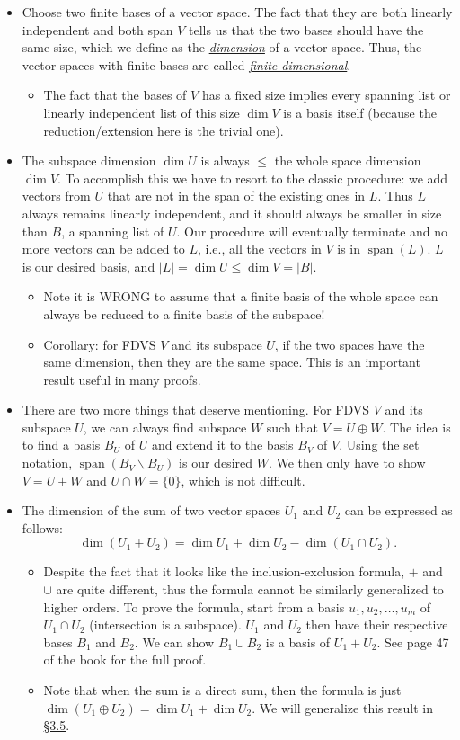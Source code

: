 \documentclass[11pt]{article}
\newcommand{\lk}[2]{\hyperlink{subsection.#1.#2}{\S#1.#2}}
\newcommand{\df}[1]{\ul{\textit{\textsf{#1}}}}
\newcommand{\s}{\operatorname{span}}
\renewcommand{\d}{\dim}
\newcommand{\abs}[1]{\lvert #1 \rvert}
\begin{document}
\begin{itemize}
    \item Choose two finite bases of a vector space. The fact that they are both linearly independent and both span $V$ tells us that the two bases should have the same size, which we define as the \df{dimension} of a vector space. Thus, the vector spaces with finite bases are called \df{finite-dimensional}.
    \begin{itemize}
        \item The fact that the bases of $V$ has a fixed size implies every spanning list or linearly independent list of this size $\d V$ is a basis itself (because the reduction/extension here is the trivial one).
    \end{itemize}
    \item The subspace dimension $\d U$ is always $\leq$ the whole space dimension $\d V$. To accomplish this we have to resort to the classic procedure: we add vectors from $U$ that are not in the span of the existing ones in $L$. Thus $L$ always remains linearly independent, and it should always be smaller in size than $B$, a spanning list of $U$. Our procedure will eventually terminate and no more vectors can be added to $L$, i.e., all the vectors in $V$ is in $\s(L)$. $L$ is our desired basis, and $\abs{L} = \d U \leq \d V = \abs{B}$.
    \begin{itemize}
        \item Note it is WRONG to assume that a finite basis of the whole space can always be reduced to a finite basis of the subspace!
        \item Corollary: for FDVS $V$ and its subspace $U$, if the two spaces have the same dimension, then they are the same space. This is an important result useful in many proofs.
    \end{itemize}
    \item There are two more things that deserve mentioning. For FDVS $V$ and its subspace $U$, we can always find subspace $W$ such that $V = U \oplus W$. The idea is to find a basis $B_U$ of $U$ and extend it to the basis $B_V$ of $V$. Using the set notation, $\s(B_V \backslash B_U)$ is our desired $W$. We then only have to show $V = U+W$ and $U \cap W = \{0\}$, which is not difficult.
    \item The dimension of the sum of two vector spaces $U_1$ and $U_2$ can be expressed as follows: $$\d (U_1 + U_2) = \d U_1 + \d U_2 - \d (U_1 \cap U_2).$$
    \begin{itemize}
        \item Despite the fact that it looks like the inclusion-exclusion formula, $+$ and $\cup$ are quite different, thus the formula cannot be similarly generalized to higher orders. To prove the formula, start from a basis $u_1,u_2,\dots,u_m$ of $U_1 \cap U_2$ (intersection is a subspace). $U_1$ and $U_2$ then have their respective bases $B_1$ and $B_2$. We can show $B_1 \cup B_2$ is a basis of $U_1 + U_2$. See page 47 of the book for the full proof.
        \item Note that when the sum is a direct sum, then the formula is just $\d(U_1 \oplus U_2) = \d U_1 + \d U_2$. We will generalize this result in \lk{3}{5}.
    \end{itemize}
\end{itemize}
\end{document}
